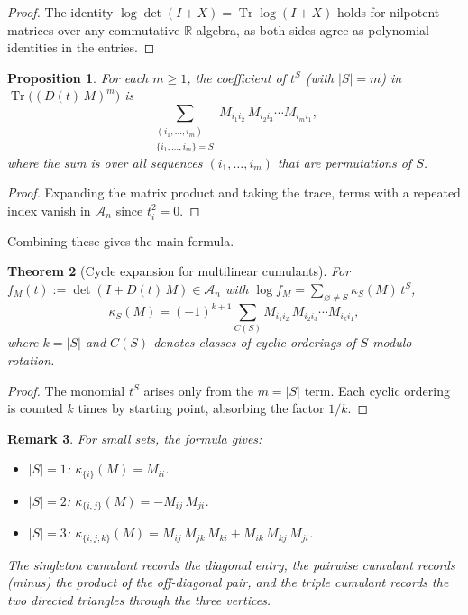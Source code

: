\documentclass[10pt,a4paper]{amsart}
\newtheorem{thm}{Theorem}[section]
\newtheorem{prop}[thm]{Proposition}
\newtheorem{remark}[thm]{Remark}
\newcommand{\R}{\mathbb{R}}
\DeclareMathOperator{\Tr}{Tr}
\begin{document}
\begin{proof}
The identity $\log\det(I+X) = \Tr\log(I+X)$ holds for nilpotent matrices over any commutative $\R$-algebra, as both sides agree as polynomial identities in the entries.
\end{proof}

\begin{prop}\label{prop:trace-cycle}
For each $m\ge 1$, the coefficient of $t^S$ (with $|S|=m$) in
$\Tr\bigl((D(t)\, M)^m\bigr)$ is
\[
  \sum_{\substack{(i_1,\dots,i_m)\\
  \{i_1,\dots,i_m\}=S}}
  M_{i_1 i_2}\, M_{i_2 i_3}\cdots M_{i_m i_1},
\]
where the sum is over all sequences $(i_1,\dots,i_m)$ that are
permutations of $S$.
\end{prop}

\begin{proof}
Expanding the matrix product and taking the trace, terms with
a repeated index vanish in $\mathcal{A}_n$ since $t_i^2=0$.
\end{proof}

Combining these gives the main formula.

\begin{thm}[Cycle expansion for multilinear cumulants]
\label{thm:cycle-expansion}
For $f_M(t) := \det(I+D(t)\, M)\in\mathcal{A}_n$ with
$\log f_M = \sum_{\varnothing\neq S} \kappa_S(M)\, t^S$,
\[
  \kappa_S(M)
  = (-1)^{k+1}
  \sum_{C(S)}
  M_{i_1 i_2}\, M_{i_2 i_3}\cdots M_{i_k i_1},
\]
where $k=|S|$ and $C(S)$ denotes classes of cyclic orderings of $S$ modulo rotation.
\end{thm}

\begin{proof}
The monomial $t^S$ arises only from the $m=|S|$ term.  Each
cyclic ordering is counted $k$ times by starting point, absorbing
the factor $1/k$.
\end{proof}

\begin{remark}\label{rem:small-cumulants}
For small sets, the formula gives:
\begin{itemize}
\item $|S|=1$:
$\kappa_{\{i\}}(M) = M_{ii}$.

\item $|S|=2$:
$\kappa_{\{i,j\}}(M) = -M_{ij}\, M_{ji}$.

\item $|S|=3$:
$\kappa_{\{i,j,k\}}(M) = M_{ij}\, M_{jk}\, M_{ki}
+ M_{ik}\, M_{kj}\, M_{ji}$.
\end{itemize}
The singleton cumulant records the diagonal entry, the pairwise
cumulant records (minus) the product of the off-diagonal pair,
and the triple cumulant records the two directed triangles
through the three vertices.
\end{remark}
\end{document}
